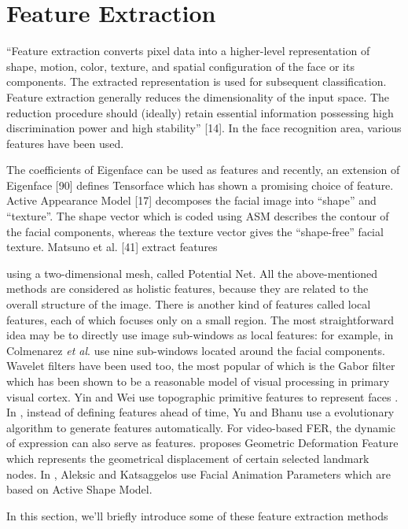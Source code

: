 \documentclass[12pt, twoside]{report}
\begin{document}
	\section{Feature Extraction}
	“Feature extraction converts pixel data into a higher-level representation of shape, motion,
	color, texture, and spatial configuration of the face or its components. The extracted
	representation is used for subsequent classification. Feature extraction generally reduces
	the dimensionality of the input space. The reduction procedure should (ideally) retain
	essential information possessing high discrimination power and high stability” [14]. In the
	face recognition area, various features have been used.

	The coefficients of Eigenface can be used as features and recently, an extension of
	Eigenface [90] defines Tensorface which has shown a promising choice of feature. Active
	Appearance Model [17] decomposes the facial image into “shape” and “texture”. The shape
	vector which is coded using ASM describes the contour of the facial components, whereas
	the texture vector gives the “shape-free” facial texture. Matsuno et al. [41] extract features
	\newpage

	\noindent using a two-dimensional mesh, called Potential Net. All the above-mentioned methods are considered as holistic features, because they are related to the overall structure of the image. There is another kind of features called local features, each of which focuses only on a small region. The most straightforward idea may be to directly use image sub-windows as local features: for example, in \cite{15} Colmenarez \textit{ et al}. use nine sub-windows located around the facial components. Wavelet filters have been used too, the most popular of which is the Gabor filter which has been shown \cite{22} \cite{37} to be a reasonable model of visual processing in primary visual cortex. Yin and Wei use topographic primitive features to represent faces \cite{103}. In \cite{104}, instead of defining features ahead of time, Yu and Bhanu use a evolutionary algorithm to generate features automatically. For video-based FER, the dynamic of expression can also serve as features. \cite{44} proposes Geometric Deformation Feature which represents the geometrical displacement of certain selected landmark nodes. In \cite{1}, Aleksic and Katsaggelos use Facial Animation Parameters which are based on Active Shape Model.
	\par In this section, we'll briefly introduce some of these feature extraction methods
	\par
\end{document}

